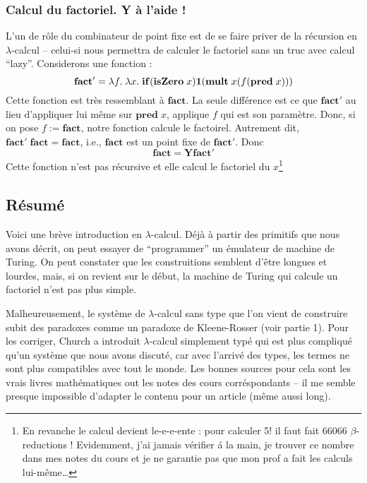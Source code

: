 \subsubsection*{Calcul du factoriel. Y à l'aide !}
L'un de rôle du combinateur de point fixe est de se faire priver de la récursion en $\lambda$-calcul -- celui-si nous permettra de calculer le factoriel sans un truc avec calcul ``lazy''.
Considerons une fonction :
$$\mathbf{fact'} = \lambda f. \; \lambda x. \; \mathbf{if} (\mathbf{isZero} \; x) \mathbf{1} (\mathbf{mult} \; x (f (\mathbf{pred} \; x)))$$
Cette fonction est très ressemblant à $\mathbf{fact}$. La seule différence est ce que $\mathbf{fact'}$ au lieu d'appliquer lui même sur $\mathbf{pred} \; x$, applique $f$ qui est son paramètre.
Donc, si on pose $f := \mathbf{fact}$, notre fonction calcule le factoirel.
Autrement dit, $\mathbf{fact'} \; \mathbf{fact} = \mathbf{fact}$, i.e., $\mathbf{fact}$ est un point fixe de $\mathbf{fact'}$.
Donc $$\mathbf{fact} = \mathbf{Y} \mathbf{fact'}$$
Cette fonction n'est pas récursive et elle calcul le factoriel du $x$\footnote{
	En revanche le calcul devient le-e-e-ente : pour calculer 5! il faut fait 66066 $\beta$-reductions ! Evidemment, j'ai jamais vérifier á la main, je trouver ce nombre dans mes notes du cours et je ne garantie pas que mon prof a fait les calculs lui-même\ldots
}

\subsection*{Résumé}

Voici une brève introduction en $\lambda$-calcul.
Déjà à partir des primitifs que nous avons décrit, on peut essayer de ``programmer'' un émulateur de machine de Turing.
On peut constater que les construitions semblent d'être longues et lourdes, mais, si on revient sur le début, la machine de Turing qui calcule un factoriel n'est pas plus simple.

Malheureusement, le système de $\lambda$-calcul sans type que l'on vient de construire subit des paradoxes comme un paradoxe de Kleene-Rosser (voir partie 1).
Pour les corriger, Church a introduit $\lambda$-calcul simplement typé qui est plus compliqué qu'un système que nous avons discuté, car avec l'arrivé des types, les termes ne sont plus compatibles avec tout le monde.
Les bonnes sources pour cela sont les vrais livres mathématiques out les notes des cours corréspondants -- il me semble presque impossible d'adapter le contenu pour un article (même aussi long).

